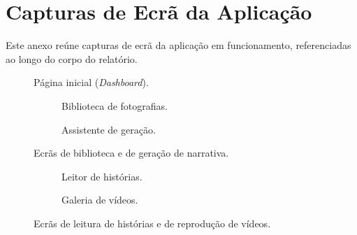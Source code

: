 
\chapter{Capturas de Ecrã da Aplicação}
\label{ap:capturas}

Este anexo reúne capturas de ecrã da aplicação em funcionamento, referenciadas
ao longo do corpo do relatório.

\begin{figure}[H]
\centering
\caption{Página inicial (\emph{Dashboard}).}
\label{fig:ui_dashboard}
\end{figure}

\begin{figure}[H]
\centering
\begin{subfigure}{0.48\textwidth}
  \centering
  \caption{Biblioteca de fotografias.}
  \label{fig:ui_library}
\end{subfigure}\hfill
\begin{subfigure}{0.48\textwidth}
  \centering
  \caption{Assistente de geração.}
  \label{fig:ui_generate}
\end{subfigure}
\caption{Ecrãs de biblioteca e de geração de narrativa.}
\label{fig:ui_pair}
\end{figure}

\begin{figure}[H]
\centering
\begin{subfigure}{0.48\textwidth}
  \centering
  \caption{Leitor de histórias.}
  \label{fig:ui_reader}
\end{subfigure}\hfill
\begin{subfigure}{0.48\textwidth}
  \centering
  \caption{Galeria de vídeos.}
  \label{fig:ui_videos}
\end{subfigure}
\caption{Ecrãs de leitura de histórias e de reprodução de vídeos.}
\label{fig:ui_pair2}
\end{figure}

